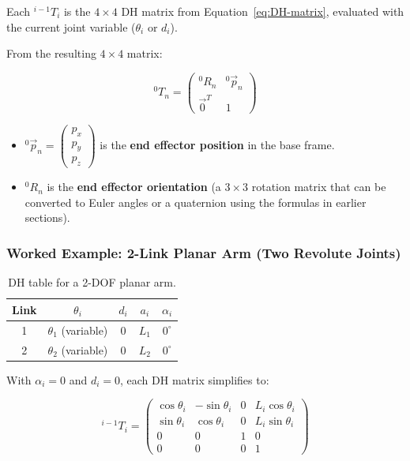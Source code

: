 \documentclass[12pt,a4paper]{article}
\begin{document}
Each ${}^{i-1}T_i$ is the $4\times4$ DH matrix from
Equation~\eqref{eq:DH-matrix}, evaluated with the current joint
variable ($\theta_i$ or $d_i$).

From the resulting $4\times4$ matrix:

\begin{equation}
  {}^{0}T_n =
  \begin{pmatrix}
    {}^{0}R_n & {}^{0}\vec{p}_n \\
    \vec{0}^T & 1
  \end{pmatrix}
\end{equation}

\begin{itemize}
  \item ${}^{0}\vec{p}_n = \begin{pmatrix} p_x \\ p_y \\ p_z \end{pmatrix}$
        is the \textbf{end effector position} in the base frame.
  \item ${}^{0}R_n$ is the \textbf{end effector orientation} (a $3\times3$
        rotation matrix that can be converted to Euler angles or a
        quaternion using the formulas in earlier sections).
\end{itemize}

\subsubsection*{Worked Example: 2-Link Planar Arm (Two Revolute Joints)}

\begin{table}[h]
\centering
\begin{tabular}{@{}ccccc@{}}
\toprule
\textbf{Link} & $\theta_i$ & $d_i$ & $a_i$ & $\alpha_i$ \\
\midrule
1 & $\theta_1$ (variable) & 0 & $L_1$ & $0^\circ$ \\
2 & $\theta_2$ (variable) & 0 & $L_2$ & $0^\circ$ \\
\bottomrule
\end{tabular}
\caption{DH table for a 2-DOF planar arm.}
\end{table}

With $\alpha_i = 0$ and $d_i = 0$, each DH matrix simplifies to:

\begin{equation}
  {}^{i-1}T_i =
  \begin{pmatrix}
    \cos\theta_i & -\sin\theta_i & 0 & L_i\cos\theta_i \\
    \sin\theta_i &  \cos\theta_i & 0 & L_i\sin\theta_i \\
    0 & 0 & 1 & 0 \\
    0 & 0 & 0 & 1
  \end{pmatrix}
\end{equation}
\end{document}
